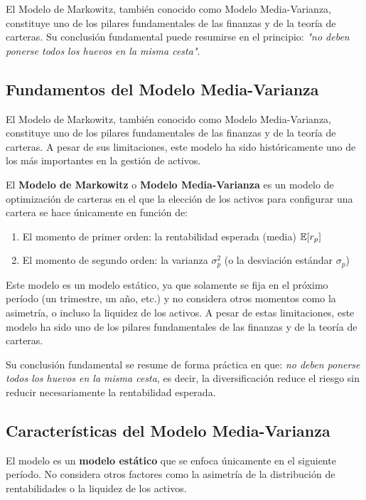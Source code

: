 El Modelo de Markowitz, también conocido como Modelo Media-Varianza, constituye uno de los pilares fundamentales de las finanzas y de la teoría de carteras. Su conclusión fundamental puede resumirse en el principio: \textit{"no deben ponerse todos los huevos en la misma cesta"}.

\subsection{Fundamentos del Modelo Media-Varianza}

El Modelo de Markowitz, también conocido como Modelo Media-Varianza, constituye uno de los pilares fundamentales de las finanzas y de la teoría de carteras. A pesar de sus limitaciones, este modelo ha sido históricamente uno de los más importantes en la gestión de activos.

\begin{definicion}
El \textbf{Modelo de Markowitz} o \textbf{Modelo Media-Varianza} es un modelo de optimización de carteras en el que la elección de los activos para configurar una cartera se hace únicamente en función de:
\begin{enumerate}
\item El momento de primer orden: la rentabilidad esperada (media) $\mathbb{E}[r_p]$
\item El momento de segundo orden: la varianza $\sigma_p^2$ (o la desviación estándar $\sigma_p$)
\end{enumerate}
\end{definicion}

Este modelo es un modelo estático, ya que solamente se fija en el próximo período (un trimestre, un año, etc.) y no considera otros momentos como la asimetría, o incluso la liquidez de los activos. A pesar de estas limitaciones, este modelo ha sido uno de los pilares fundamentales de las finanzas y de la teoría de carteras.

Su conclusión fundamental se resume de forma práctica en que: \textit{no deben ponerse todos los huevos en la misma cesta}, es decir, la diversificación reduce el riesgo sin reducir necesariamente la rentabilidad esperada.

\subsection{Características del Modelo Media-Varianza}

El modelo es un \textbf{modelo estático} que se enfoca únicamente en el siguiente período. No considera otros factores como la asimetría de la distribución de rentabilidades o la liquidez de los activos.

